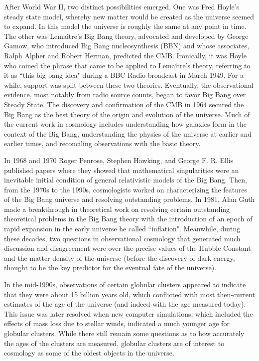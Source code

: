 \documentclass[14pt, oneside]{book}
\begin{document}
			After World War II, two distinct possibilities emerged. One was Fred Hoyle's steady state model, whereby new matter would be created as the universe seemed to expand. In this model the universe is roughly the same at any point in time. The other was Lemaître's Big Bang theory, advocated and developed by George Gamow, who introduced Big Bang nucleosynthesis (BBN) and whose associates, Ralph Alpher and Robert Herman, predicted the CMB. Ironically, it was Hoyle who coined the phrase that came to be applied to Lemaître's theory, referring to it as ``this big bang idea" during a BBC Radio broadcast in March 1949. For a while, support was split between these two theories. Eventually, the observational evidence, most notably from radio source counts, began to favor Big Bang over Steady State. The discovery and confirmation of the CMB in 1964 secured the Big Bang as the best theory of the origin and evolution of the universe. Much of the current work in cosmology includes understanding how galaxies form in the context of the Big Bang, understanding the physics of the universe at earlier and earlier times, and reconciling observations with the basic theory.
			
			In 1968 and 1970 Roger Penrose, Stephen Hawking, and George F. R. Ellis published papers where they showed that mathematical singularities were an inevitable initial condition of general relativistic models of the Big Bang. Then, from the 1970s to the 1990s, cosmologists worked on characterizing the features of the Big Bang universe and resolving outstanding problems. In 1981, Alan Guth made a breakthrough in theoretical work on resolving certain outstanding theoretical problems in the Big Bang theory with the introduction of an epoch of rapid expansion in the early universe he called ``inflation". Meanwhile, during these decades, two questions in observational cosmology that generated much discussion and disagreement were over the precise values of the Hubble Constant and the matter-density of the universe (before the discovery of dark energy, thought to be the key predictor for the eventual fate of the universe).
			
			In the mid-1990s, observations of certain globular clusters appeared to indicate that they were about 15 billion years old, which conflicted with most then-current estimates of the age of the universe (and indeed with the age measured today). This issue was later resolved when new computer simulations, which included the effects of mass loss due to stellar winds, indicated a much younger age for globular clusters. While there still remain some questions as to how accurately the ages of the clusters are measured, globular clusters are of interest to cosmology as some of the oldest objects in the universe.
			
\end{document}
